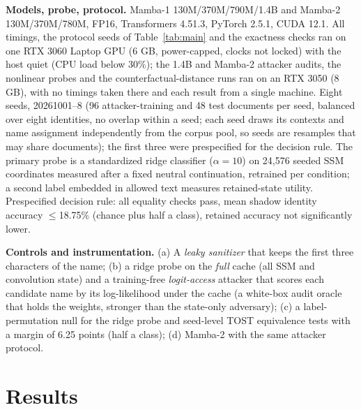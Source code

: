 \documentclass[conference]{IEEEtran}
\begin{document}
\textbf{Models, probe, protocol.} Mamba-1 130M/370M/790M/1.4B and Mamba-2 130M/370M/780M, FP16, Transformers 4.51.3, PyTorch
2.5.1, CUDA 12.1. All timings, the protocol seeds of Table~\ref{tab:main} and the exactness checks ran on one RTX 3060 Laptop GPU (6 GB, power-capped, clocks not locked) with the host quiet (CPU load below 30\%); the 1.4B and Mamba-2 attacker audits, the nonlinear probes and the counterfactual-distance runs ran on an RTX 3050 (8 GB), with no timings taken there and each result from a single machine. Eight seeds, 20261001--8 (96 attacker-training and 48 test documents per seed, balanced
over eight identities, no overlap within a seed; each seed draws its contexts and name assignment independently from the corpus pool, so seeds are resamples that may share documents); the first three were prespecified for the decision rule. The primary
probe is a standardized ridge classifier ($\alpha{=}10$) on 24{,}576 seeded SSM coordinates measured after a
fixed neutral continuation, retrained per condition; a second label embedded in allowed text measures
retained-state utility. Prespecified decision rule: all equality checks pass, mean shadow
identity accuracy $\le$18.75\% (chance plus half a class), retained accuracy not significantly lower.

\textbf{Controls and instrumentation.} (a) A \emph{leaky sanitizer} that keeps the first three characters of the
name; (b) a ridge probe on the \emph{full} cache (all SSM and convolution state) and a training-free
\emph{logit-access} attacker that scores each candidate name by its log-likelihood under the cache (a white-box audit
oracle that holds the weights, stronger than the state-only adversary); (c) a
label-permutation null for the ridge probe and seed-level TOST equivalence tests with a margin of 6.25 points (half a class); (d) Mamba-2 with the same attacker protocol.

\section{Results}
\end{document}
